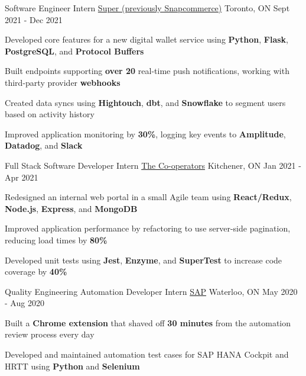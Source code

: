 \begin{cventries}
  \cventry
    {Software Engineer Intern} %
    {\href{https://www.super.com/}{Super (previously Snapcommerce)}} %
    {Toronto, ON} %
    {Sept 2021 - Dec 2021} %
    {
      \begin{cvitems} %
      \item {Developed core features for a new digital wallet service using \textbf{Python}, \textbf{Flask}, \textbf{PostgreSQL}, and \textbf{Protocol Buffers}}
      \item {Built endpoints supporting \textbf{over 20} real-time push notifications, working with third-party provider \textbf{webhooks}}
      \item {Created data syncs using \textbf{Hightouch}, \textbf{dbt}, and \textbf{Snowflake} to segment users based on activity history}
      \item {Improved application monitoring by \textbf{30\%}, logging key events to \textbf{Amplitude}, \textbf{Datadog}, and \textbf{Slack}}
      \end{cvitems}
    }

  \cventry
    {Full Stack Software Developer Intern} %
    {\href{https://www.cooperators.ca/}{The Co-operators}} %
    {Kitchener, ON} %
    {Jan 2021 - Apr 2021} %
    {
      \begin{cvitems} %
      \item {Redesigned an internal web portal in a small Agile team using \textbf{React/Redux}, \textbf{Node.js}, \textbf{Express}, and \textbf{MongoDB}}
      \item {Improved application performance by refactoring to use server-side pagination, reducing load times by \textbf{80\%}}
      \item {Developed unit tests using \textbf{Jest}, \textbf{Enzyme}, and \textbf{SuperTest} to increase code coverage by \textbf{40\%}}
      \end{cvitems}
    }
    
  \cventry
    {Quality Engineering Automation Developer Intern} %
    {\href{https://www.sap.com/canada/index.html}{SAP}} %
    {Waterloo, ON} %
    {May 2020 - Aug 2020} %
    {
      \begin{cvitems} %
      \item {Built a \textbf{Chrome extension} that shaved off \textbf{30 minutes} from the automation review process every day}
      \item {Developed and maintained automation test cases for SAP HANA Cockpit and HRTT using \textbf{Python} and \textbf{Selenium}}
      \end{cvitems}
    }
       
\end{cventries}
